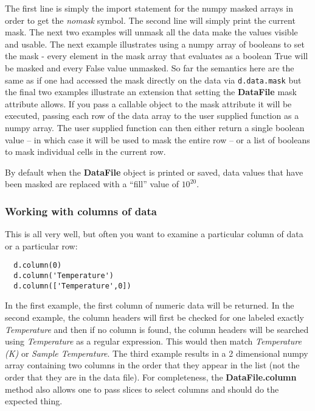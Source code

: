 \documentclass[a4paper,11pt]{scrartcl}
\begin{document}
The first line is simply the import statement for the numpy masked arrays in order to get the \textit{nomask} symbol. The second line will simply print the current mask. The next two examples will unmask all the data \ie make the values visible and usable. The next example illustrates using a numpy array of booleans to set the mask - every element in the mask array that evaluates as a boolean True will be masked and every False value unmasked. So far the semantics here are the same as if one had accessed the mask directly on the data via \verb'd.data.mask' but the final two examples illustrate an extension that setting the \textbf{DataFile} mask attribute allows. If you pass a callable object to the mask attribute it will be executed, passing each row of the data array to the user supplied function as a numpy array. The user supplied function can then either return a single boolean value -- in which case it will be used to mask the entire row -- or a list of booleans to mask individual cells in the current row.

By default when the \textbf{DataFile} object is printed or saved, data values that have been masked are replaced with a ``fill'' value of $10^{20}$.


\subsubsection{Working with columns of data}

This is all very well, but often you want to examine a particular column of data
or a particular row:
\begin{lstlisting}
  d.column(0)
  d.column('Temperature')
  d.column(['Temperature',0])
\end{lstlisting}
In the first example, the first column of numeric data will be returned. In the
second example, the column headers will first be checked for one labeled exactly
\textit{Temperature} and then if no column is found, the column headers will be
searched using \textit{Temperature} as a regular expression. This would then
match \textit{Temperature (K)} or \textit{Sample Temperature}.  The third
example results in a 2 dimensional numpy array containing two columns in the
order that they appear in the list (\ie not the order that they are in the data
file). For completeness, the \textbf{DataFile.column} method also allows one to
pass slices to select columns and should do the expected thing.
\end{document}
